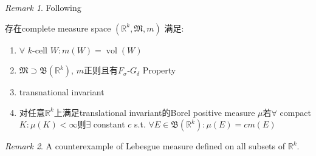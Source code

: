 \documentclass[hidelinks]{article}
\theoremstyle{definition}
\theoremstyle{remark}
\newtheorem*{remark}{Remark}
\theoremstyle{plain}
\theoremstyle{dotless}
\newenvironment{proposition}[1]
  {\renewcommand\theinnercustomthm{#1}\innercustomthm}
  {\endinnercustomthm}
\theoremstyle{dotless}
\DeclareMathOperator\vol{vol}
\begin{document}
\begin{remark}
Following 
\end{remark}

\begin{proposition}{2.20}
存在complete measure space $(\mathbb{R}^k,\mathfrak{M},m)$ 满足:\begin{enumerate}
    \item $\forall$ $k$-cell $W:m(W)=\vol(W)$
    \item $\mathfrak{M}\supset\mathfrak{B}(\mathbb{R}^k)$, $m$正则且有$F_\sigma$-$G_\delta$ Property
    \item transnational invariant
    \item 对任意$\mathbb{R}^k$上满足translational invariant的Borel positive measure $\mu$若$\forall$ compact $K:\mu(K)<\infty$则$\exists$ constant $c$ s.t. $\forall E\in\mathfrak{B}(\mathbb{R}^k):\mu(E)=cm(E)$
\end{enumerate}
\end{proposition}

\begin{remark}
A counterexample of Lebesgue measure defined on all subsets of $\mathbb{R}^k$.
\end{remark}
\end{document}
